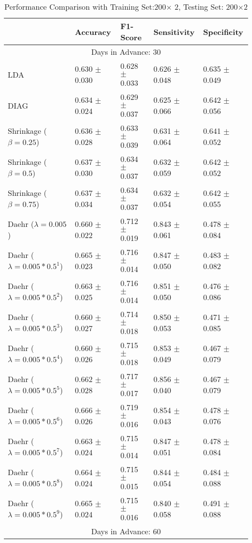 \begin{table}
\caption{Performance Comparison with Training Set:200$\times$ 2, Testing Set: 200$\times$2}
\footnotesize
\centering
\begin{tabular}{*{5}{l}}
\toprule
 & Accuracy & F1-Score & Sensitivity & Specificity\\
\hline\multicolumn{5}{c}{  Days in Advance: 30}\\\hline
LDA&0.630 $\pm$ 0.030&0.628 $\pm$ 0.033&0.626 $\pm$ 0.048&0.635 $\pm$ 0.049\\
DIAG&0.634 $\pm$ 0.024&0.629 $\pm$ 0.037&0.625 $\pm$ 0.066&0.642 $\pm$ 0.056\\
Shrinkage ($\beta=0.25$)&0.636 $\pm$ 0.028&0.633 $\pm$ 0.039&0.631 $\pm$ 0.064&0.641 $\pm$ 0.052\\
Shrinkage ($\beta=0.5$)&0.637 $\pm$ 0.030&0.634 $\pm$ 0.037&0.632 $\pm$ 0.059&0.642 $\pm$ 0.052\\
Shrinkage ($\beta=0.75$)&0.637 $\pm$ 0.034&0.634 $\pm$ 0.037&0.632 $\pm$ 0.054&0.642 $\pm$ 0.055\\
Daehr ($\lambda=0.005$)&0.660 $\pm$ 0.022&0.712 $\pm$ 0.019&0.843 $\pm$ 0.061&0.478 $\pm$ 0.084\\
Daehr ($\lambda=0.005*0.5^1$)&0.665 $\pm$ 0.023&0.716 $\pm$ 0.014&0.847 $\pm$ 0.050&0.483 $\pm$ 0.082\\
Daehr ($\lambda=0.005*0.5^2$)&0.663 $\pm$ 0.025&0.716 $\pm$ 0.014&0.851 $\pm$ 0.050&0.476 $\pm$ 0.086\\
Daehr ($\lambda=0.005*0.5^3$)&0.660 $\pm$ 0.027&0.714 $\pm$ 0.018&0.850 $\pm$ 0.053&0.471 $\pm$ 0.085\\
Daehr ($\lambda=0.005*0.5^4$)&0.660 $\pm$ 0.026&0.715 $\pm$ 0.018&0.853 $\pm$ 0.049&0.467 $\pm$ 0.079\\
Daehr ($\lambda=0.005*0.5^5$)&0.662 $\pm$ 0.028&0.717 $\pm$ 0.017&0.856 $\pm$ 0.040&0.467 $\pm$ 0.079\\
Daehr ($\lambda=0.005*0.5^6$)&0.666 $\pm$ 0.026&0.719 $\pm$ 0.016&0.854 $\pm$ 0.043&0.478 $\pm$ 0.076\\
Daehr ($\lambda=0.005*0.5^7$)&0.663 $\pm$ 0.024&0.715 $\pm$ 0.014&0.847 $\pm$ 0.051&0.478 $\pm$ 0.084\\
Daehr ($\lambda=0.005*0.5^8$)&0.664 $\pm$ 0.024&0.715 $\pm$ 0.015&0.844 $\pm$ 0.054&0.484 $\pm$ 0.088\\
Daehr ($\lambda=0.005*0.5^9$)&0.665 $\pm$ 0.024&0.715 $\pm$ 0.016&0.840 $\pm$ 0.058&0.491 $\pm$ 0.088\\
\hline\multicolumn{5}{c}{  Days in Advance: 60}\\\hline

\end{tabular}
\end{table}
